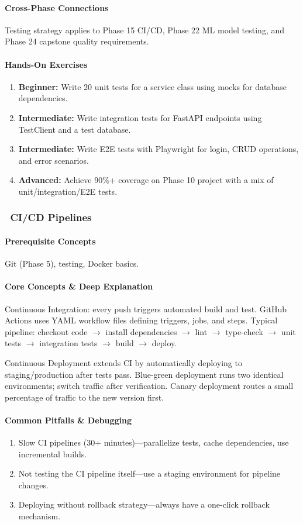 \documentclass[11pt, a4paper, oneside]{report}
\newcommand{\mustmaster}[1]{\subsubsection{\texorpdfstring{\fcolorbox{blue!40!black}{blue!8}{\footnotesize\bfseries\color{blue!40!black} MUST MASTER}~#1}{#1}}}
\newcommand{\arrow}{$\rightarrow$}
\begin{document}
\paragraph{Cross-Phase Connections} Testing strategy applies to Phase 15 CI/CD, Phase 22 ML model testing, and Phase 24 capstone quality requirements.

\paragraph{Hands-On Exercises}
\begin{enumerate}[leftmargin=*]
\item \textbf{Beginner:} Write 20 unit tests for a service class using mocks for database dependencies.
\item \textbf{Intermediate:} Write integration tests for FastAPI endpoints using TestClient and a test database.
\item \textbf{Intermediate:} Write E2E tests with Playwright for login, CRUD operations, and error scenarios.
\item \textbf{Advanced:} Achieve 90\%+ coverage on Phase 10 project with a mix of unit/integration/E2E tests.
\end{enumerate}

\mustmaster{CI/CD Pipelines}

\paragraph{Prerequisite Concepts} Git (Phase 5), testing, Docker basics.

\paragraph{Core Concepts \& Deep Explanation} Continuous Integration: every push triggers automated build and test. GitHub Actions uses YAML workflow files defining triggers, jobs, and steps. Typical pipeline: checkout code \arrow{} install dependencies \arrow{} lint \arrow{} type-check \arrow{} unit tests \arrow{} integration tests \arrow{} build \arrow{} deploy.

Continuous Deployment extends CI by automatically deploying to staging/production after tests pass. Blue-green deployment runs two identical environments; switch traffic after verification. Canary deployment routes a small percentage of traffic to the new version first.

\paragraph{Common Pitfalls \& Debugging}
\begin{enumerate}[leftmargin=*]
\item Slow CI pipelines (30+ minutes)---parallelize tests, cache dependencies, use incremental builds.
\item Not testing the CI pipeline itself---use a staging environment for pipeline changes.
\item Deploying without rollback strategy---always have a one-click rollback mechanism.
\end{enumerate}
\end{document}
